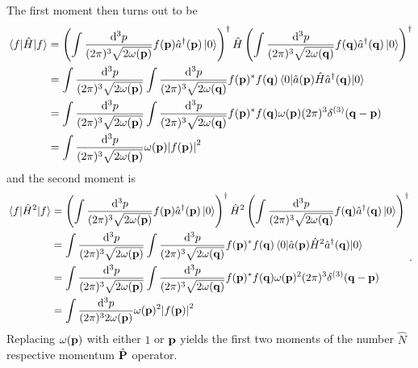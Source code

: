 The first moment then turns out to be
\begin{equation}
	\begin{split}
		\expval{\hat{H}}{f}
		&=
		\left(
			\int\frac{\dd[3]{p}}{(2\pi)^3\sqrt{2\omega(\vb{p})}}
			f(\vb{p})
			\hat{a}^\dagger(\vb{p})
			\ket{0}
		\right)^\dagger
		\hat{H}
		\left(
			\int\frac{\dd[3]{p}}{(2\pi)^3\sqrt{2\omega(\vb{q})}}
			f(\vb{q})
			\hat{a}^\dagger(\vb{q})
			\ket{0}
		\right)^\dagger
		\\
		&=
		\int\frac{\dd[3]{p}}{(2\pi)^3\sqrt{2\omega(\vb{p})}}
		\int\frac{\dd[3]{p}}{(2\pi)^3\sqrt{2\omega(\vb{q})}}
		f(\vb{p})^*
		f(\vb{q})
		\expval{
			\hat{a}(\vb{p})
			\hat{H}
			\hat{a}^\dagger(\vb{q})
		}{0}
		\\
		&=
		\int\frac{\dd[3]{p}}{(2\pi)^3\sqrt{2\omega(\vb{p})}}
		\int\frac{\dd[3]{p}}{(2\pi)^3\sqrt{2\omega(\vb{q})}}
		f(\vb{p})^*
		f(\vb{q})		
		\omega(\vb{p})
		(2\pi)^3\delta^{(3)}(\vb{q}-\vb{p})
		\\
		&=
		\int\frac{\dd[3]{p}}{(2\pi)^3\sqrt{2\omega(\vb{p})}}
		\omega(\vb{p})
		\abs{f(\vb{p})}^2
	\end{split}
\end{equation}
and the second moment is
\begin{equation}
	\begin{split}
		\expval{\hat{H}^2}{f}
		&=
		\left(
			\int\frac{\dd[3]{p}}{(2\pi)^3\sqrt{2\omega(\vb{p})}}
			f(\vb{p})
			\hat{a}^\dagger(\vb{p})
			\ket{0}
		\right)^\dagger
		\hat{H}^2
		\left(
			\int\frac{\dd[3]{p}}{(2\pi)^3\sqrt{2\omega(\vb{q})}}
			f(\vb{q})
			\hat{a}^\dagger(\vb{q})
			\ket{0}
		\right)^\dagger
		\\
		&=
		\int\frac{\dd[3]{p}}{(2\pi)^3\sqrt{2\omega(\vb{p})}}
		\int\frac{\dd[3]{p}}{(2\pi)^3\sqrt{2\omega(\vb{q})}}
		f(\vb{p})^*
		f(\vb{q})
		\expval{
			\hat{a}(\vb{p})
			\hat{H}^2
			\hat{a}^\dagger(\vb{q})
		}{0}
		\\
		&=
		\int\frac{\dd[3]{p}}{(2\pi)^3\sqrt{2\omega(\vb{p})}}
		\int\frac{\dd[3]{p}}{(2\pi)^3\sqrt{2\omega(\vb{q})}}
		f(\vb{p})^*
		f(\vb{q})
		\omega(\vb{p})^2
		(2\pi)^3
		\delta^{(3)}(\vb{q}-\vb{p})
		\\
		&=
		\int\frac{\dd[3]{p}}{(2\pi)^32\omega(\vb{p})}
		\omega(\vb{p})^2
		\abs{f(\vb{p})}^2
	\end{split}
	.
\end{equation}
Replacing $\omega(\vb{p})$ with either $1$ or $\vb{p}$ yields the first two moments of the number $\hat{N}$ respective momentum $\hat{\vb{P}}$ operator.

